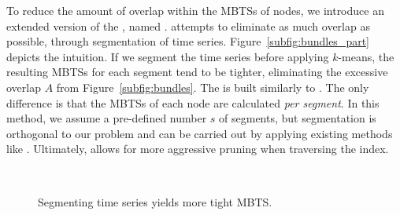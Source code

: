 To reduce the amount of overlap within the MBTSs of nodes, we introduce an extended version of the \btsr, named \sbtsr. \sbtsr attempts to eliminate as much overlap as possible, through segmentation of time series. Figure~\ref{subfig:bundles_part} depicts the intuition. If we segment the time series before applying $k$-means, the resulting MBTSs for each segment tend to be tighter, eliminating the excessive overlap $A$ from Figure~\ref{subfig:bundles}. The \sbtsr is built similarly to \btsr. The only difference is that the MBTSs of each node are calculated \textit{per segment}. In this method, we assume a pre-defined number $s$ of segments, but segmentation is orthogonal to our problem and can be carried out by applying existing methods like \cite{bingham2006segmentation}. Ultimately, \sbtsr allows for more aggressive pruning when traversing the index.


\begin{figure}[tb]
 \centering
  \\
 \vspace{-10pt} 
 \caption{Segmenting time series yields more tight MBTS.}
 \label{fig:proof_partition}
\end{figure}



